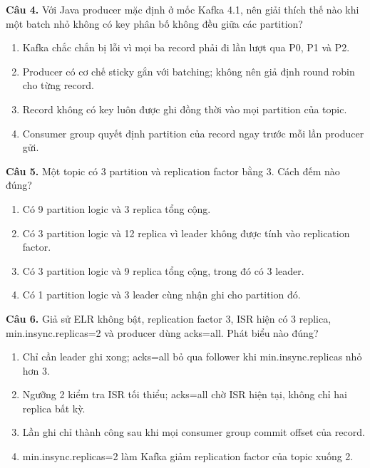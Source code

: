 \noindent\begin{minipage}{\linewidth}
\small
\textbf{Câu 4.} Với Java producer mặc định ở mốc Kafka 4.1, nên giải thích thế nào khi một batch nhỏ không có key phân bố không đều giữa các partition?
\begin{enumerate}[label=\textbf{\Alph*.},leftmargin=2em,itemsep=0pt,topsep=2pt]
\item Kafka chắc chắn bị lỗi vì mọi ba record phải đi lần lượt qua P0, P1 và P2.
\item Producer có cơ chế sticky gắn với batching; không nên giả định round robin cho từng record.
\item Record không có key luôn được ghi đồng thời vào mọi partition của topic.
\item Consumer group quyết định partition của record ngay trước mỗi lần producer gửi.
\end{enumerate}
\end{minipage}\par\addvspace{0.5em}

\noindent\begin{minipage}{\linewidth}
\small
\textbf{Câu 5.} Một topic có 3 partition và replication factor bằng 3. Cách đếm nào đúng?
\begin{enumerate}[label=\textbf{\Alph*.},leftmargin=2em,itemsep=0pt,topsep=2pt]
\item Có 9 partition logic và 3 replica tổng cộng.
\item Có 3 partition logic và 12 replica vì leader không được tính vào replication factor.
\item Có 3 partition logic và 9 replica tổng cộng, trong đó có 3 leader.
\item Có 1 partition logic và 3 leader cùng nhận ghi cho partition đó.
\end{enumerate}
\end{minipage}\par\addvspace{0.5em}

\noindent\begin{minipage}{\linewidth}
\small
\textbf{Câu 6.} Giả sử ELR không bật, replication factor 3, ISR hiện có 3 replica, min.insync.replicas=2 và producer dùng acks=all. Phát biểu nào đúng?
\begin{enumerate}[label=\textbf{\Alph*.},leftmargin=2em,itemsep=0pt,topsep=2pt]
\item Chỉ cần leader ghi xong; acks=all bỏ qua follower khi min.insync.replicas nhỏ hơn 3.
\item Ngưỡng 2 kiểm tra ISR tối thiểu; acks=all chờ ISR hiện tại, không chỉ hai replica bất kỳ.
\item Lần ghi chỉ thành công sau khi mọi consumer group commit offset của record.
\item min.insync.replicas=2 làm Kafka giảm replication factor của topic xuống 2.
\end{enumerate}
\end{minipage}\par\addvspace{0.5em}

